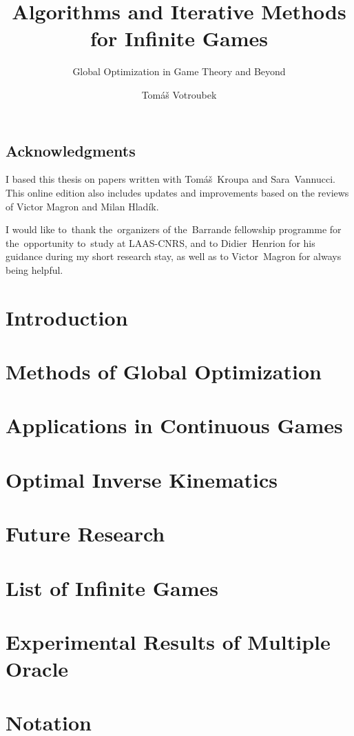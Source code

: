 \documentclass[headings=standardclasses,headings=big,chapterprefix=false]{scrbook}
\title{Algorithms and Iterative Methods \\ for Infinite Games}
\subtitle{Global Optimization in Game Theory and Beyond}
\author{Tomáš Votroubek}
\date{\the\year}
\begin{document}
\frontmatter
\maketitle
\section*{Acknowledgments}
I based this thesis on papers written with Tomáš~Kroupa and Sara~Vannucci. This online edition also includes updates and improvements based on the reviews of Victor Magron and Milan Hladík.

I would like to~thank the~organizers of the~Barrande fellowship programme for the~opportunity to~study at LAAS-CNRS, and to Didier~Henrion for his guidance during my short research stay, as well as to Victor~Magron for always being helpful.

\tableofcontents

\mainmatter
\chapter{Introduction}


\chapter{Methods of Global Optimization}\label{ch:global}

\chapter{Applications in Continuous Games}\label{ch:games}

\chapter{Optimal Inverse Kinematics}\label{ch:ik}


\chapter{Future Research}


\appendix
\chapter{List of Infinite Games}\label{appendix:games}

\chapter{Experimental Results of Multiple Oracle}\label{appendix:do.results}


\backmatter

\printbibliography

\chapter*{Notation}

\end{document}
